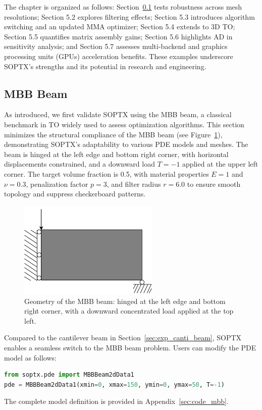 \documentclass[mathpazo]{cicp}
\begin{document}
The chapter is organized as follows: Section~\ref{sec:exp_mbb_beam} tests robustness across mesh resolutions; Section 5.2 explores filtering effects; Section 5.3 introduces algorithm switching and an updated MMA optimizer; Section 5.4 extends to 3D TO; Section 5.5 quantifies matrix assembly gains; Section 5.6 highlights AD in sensitivity analysis; and Section 5.7 assesses multi-backend and graphics processing units (GPUs) acceleration benefits. These examples underscore SOPTX's strengths and its potential in research and engineering.

\subsection{MBB Beam}\label{sec:exp_mbb_beam}
As introduced, we first validate SOPTX using the MBB beam, a classical benchmark in TO widely used to assess optimization algorithms. This section minimizes the structural compliance of the MBB beam (see Figure~\ref{fig:mbb_beam}), demonstrating SOPTX's adaptability to various PDE models and meshes. The beam is hinged at the left edge and bottom right corner, with horizontal displacements constrained, and a downward load $T = -1$ applied at the upper left corner. The target volume fraction is 0.5, with material properties $E = 1$ and $\nu = 0.3$, penalization factor $p = 3$, and filter radius $r = 6.0$ to ensure smooth topology and suppress checkerboard patterns.
\vspace{-2ex} %
\begin{figure}[htp]
	\centering
	\includegraphics[width=0.6\textwidth]{figures/mbb_2d.png}
	\caption{Geometry of the MBB beam: hinged at the left edge and bottom right corner, with a downward concentrated load applied at the top left.}
	\label{fig:mbb_beam}
\end{figure}
\vspace{-2ex} %

Compared to the cantilever beam in Section~\ref{sec:exp_canti_beam}, SOPTX enables a seamless switch to the MBB beam problem. Users can modify the PDE model as follows:
\begin{lstlisting}[language=Python]
from soptx.pde import MBBBeam2dData1
pde = MBBBeam2dData1(xmin=0, xmax=150, ymin=0, ymax=50, T=-1)
\end{lstlisting}
The complete model definition is provided in Appendix~\ref{sec:code_mbb}.
\end{document}
